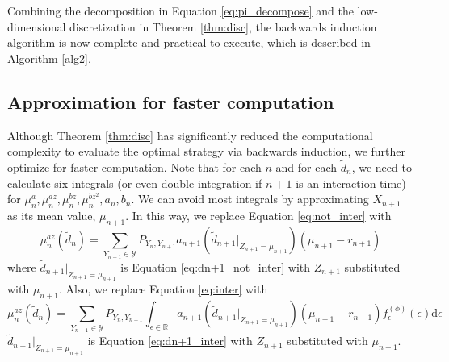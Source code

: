 Combining the decomposition in Equation \eqref{eq:pi_decompose} and the low-dimensional discretization in Theorem \ref{thm:disc}, the backwards induction algorithm is now complete and practical to execute, which is described in Algorithm \ref{alg2}.

\subsection{Approximation for faster computation}\label{sec:approx}
Although Theorem \ref{thm:disc} has significantly reduced the computational complexity to evaluate the optimal strategy via backwards induction, we further optimize for faster computation. Note that for each $n$ and for each $\tilde d_n$, we need to calculate six integrals (or even double integration if $n+1$ is an interaction time) for $\mu_n^a,\mu_n^{az},\mu_n^{bz},\mu_n^{bz^2},a_n,b_n$. We can avoid most integrals by approximating $X_{n+1}$ as its mean value, $\mu_{n+1}$. In this way, we replace Equation \eqref{eq:not_inter} with \begin{equation}
    \label{eq:not_inter_approx}
    \mu_n^{az}(\tilde d_n)=\sum_{Y_{n+1}\in\mathcal Y}P_{Y_n,Y_{n+1}} a_{n+1}(\tilde d_{n+1}|_{Z_{n+1}=\mu_{n+1}})(\mu_{n+1}-r_{n+1})
\end{equation} where $\tilde d_{n+1}|_{Z_{n+1}=\mu_{n+1}}$ is Equation \eqref{eq:dn+1_not_inter} with $Z_{n+1}$ substituted with $\mu_{n+1}$. Also, we replace Equation \eqref{eq:inter} with \begin{equation}
    \label{eq:inter_approx}
    \mu_{n}^{az}(\tilde d_n)=\sum_{Y_{n+1}\in\mathcal Y}P_{Y_n,Y_{n+1}}\int_{\epsilon\in\mathbb R} a_{n+1}(\tilde d_{n+1}|_{Z_{n+1}=\mu_{n+1}})(\mu_{n+1}-r_{n+1})f^{(\phi)}_\epsilon(\epsilon)\mathrm d\epsilon
\end{equation} $\tilde d_{n+1}|_{Z_{n+1}=\mu_{n+1}}$ is Equation \eqref{eq:dn+1_inter} with $Z_{n+1}$ substituted with $\mu_{n+1}$.

